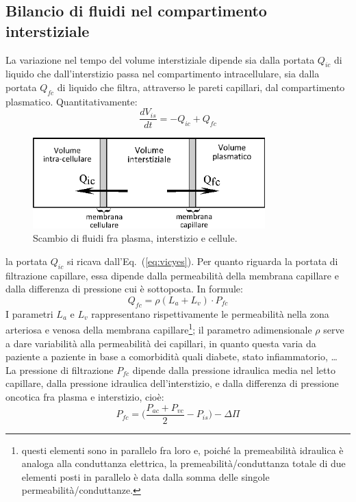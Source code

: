 \subsection{Bilancio di fluidi nel compartimento interstiziale}
La variazione nel tempo del volume interstiziale dipende sia dalla portata $Q_{ic}$ di liquido che dall'interstizio passa nel compartimento intracellulare, sia dalla portata $Q_{fc}$ di liquido che filtra, attraverso le pareti capillari, dal compartimento plasmatico. Quantitativamente:
\begin{equation}
	\frac{dV_{is}}{dt} = - Q_{ic} + Q_{fc}
\end{equation}
\begin{figure}[htb]
	\centering
		\includegraphics[width=0.8\textwidth]{immagini/vol_is.eps}
				\caption{Scambio di fluidi fra plasma, interstizio e cellule.}
\end{figure}
la portata $Q_{ic}$ si ricava dall'Eq.~(\ref{eq:vicyes}). Per quanto riguarda la portata di filtrazione capillare, essa dipende dalla permeabilità della membrana capillare e dalla differenza di pressione cui è sottoposta. In formule:
\begin{equation}\label{eq:qfcnot}
	Q_{fc} = \rho(L_a+L_v)\cdot P_{fc}
\end{equation}
I parametri $L_a$ e $L_v$ rappresentano rispettivamente le permeabilità nella zona arteriosa e venosa della membrana capillare\footnote{questi elementi sono in parallelo fra loro e, poiché la premeabilità idraulica è analoga alla conduttanza elettrica, la premeabilità/conduttanza totale di due elementi posti in parallelo è data dalla somma delle singole permeabilità/conduttanze.}; il parametro adimensionale $\rho$ serve a dare variabilità alla permeabilità dei capillari, in quanto questa varia da paziente a paziente in base a comorbidità quali diabete, stato infiammatorio, \ldots
La pressione di filtrazione $P_{fc}$ dipende dalla pressione idraulica media nel letto capillare, dalla pressione idraulica dell'interstizio, e dalla differenza di pressione oncotica fra plasma e interstizio, cioè:
\begin{equation}
	P_{fc} = \biggl(\frac{P_{ac}+P_{vc}}{2} - P_{is}\biggr) - \Delta \Pi
\end{equation}
